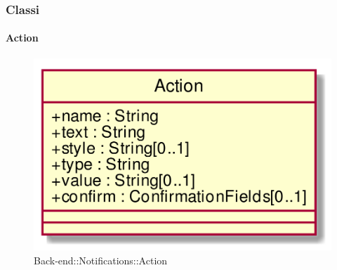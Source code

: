 \subsubsection{Classi}
\hypertarget{Action_label}{\paragraph{Action}}
\begin{figure}[h]
	\centering
	\includegraphics[width=\textwidth,height=\textheight,keepaspectratio]{images/ClassAction.png}
	\caption{Back-end::Notifications::Action}
\end{figure}
